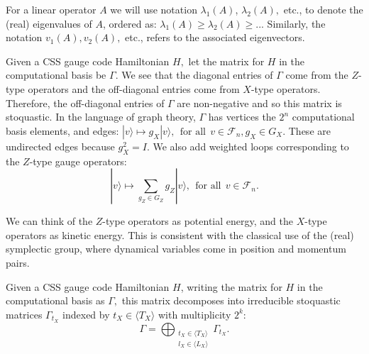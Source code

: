 \documentclass[11pt,oneside]{article}
\newcommand{\ket}[1]{|{#1}\rangle}
\def\Span#1{\langle #1 \rangle}
\def\smbox#1{\ \ \mbox{#1}\ \ }
\newcommand{\Field}{\mathcal{F}}
\def\Fnd{\Field_{n}}
\newcommand\dolemma[1]{\vskip 5pt \noindent{\bf \underline{Lemma #1.}\ }}
\newcounter{numitem}
\newcommand{\numitem}[1]{\refstepcounter{numitem}\thenumitem\label{#1}}
\begin{document}
For a linear operator $A$ we will use notation 
$\lambda_1(A)$, $\lambda_2(A),$ etc., to denote the (real) eigenvalues of $A$,
ordered as:
$
    \lambda_1(A) \ge \lambda_2(A) \ge ...
$
Similarly, the notation $v_1(A), v_2(A),$ etc., refers to the associated eigenvectors.

Given a CSS gauge code Hamiltonian $H,$ 
let the matrix for $H$ in the computational basis be $\Gamma.$
We see that the diagonal entries of $\Gamma$
come from the $Z$-type operators and the off-diagonal entries 
come from $X$-type operators.
Therefore, the off-diagonal entries of $\Gamma$ are non-negative 
and so this matrix is stoquastic.
In the language of graph theory,
$\Gamma$ has vertices the $2^n$ computational
basis elements, and edges:
$
    \ket{v} \mapsto g_X \ket{v}, \smbox{for all} v\in\Fnd, g_X\in G_X.
$
These are undirected edges because $g_X^2 = I.$
We also add weighted loops corresponding to the $Z$-type gauge operators:
$$
    \ket{v} \mapsto \sum_{g_Z\in G_Z} g_Z \ket{v}, \smbox{for all} v\in\Fnd.
$$

We can think of the $Z$-type operators as potential energy,
and the $X$-type operators as kinetic energy.
This is consistent with the classical use of the (real) symplectic group,
where dynamical variables come in position and momentum pairs.

\dolemma{\numitem{lemma21}}
Given a CSS gauge code Hamiltonian $H$, writing
the matrix for $H$ in the computational basis as $\Gamma,$
this matrix decomposes into irreducible
stoquastic matrices $\Gamma_{t_X}$ 
indexed by $t_X\in\Span{T_X}$
with multiplicity $2^k$:
$$
    \Gamma = \bigoplus_{
    \substack{t_X\in\Span{T_X}\\l_X\in\Span{L_X}}}
        \Gamma_{t_X}.
$$
\end{document}
